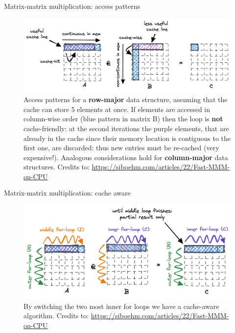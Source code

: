 \documentclass[10pt,aspectratio=169]{beamer}
\begin{document}
\begin{frame}{Matrix-matrix multiplication: access patterns}
    \begin{figure}
        \centering
        \includegraphics[width=\textwidth]{images/cache-unaware-dot-product.png}
        \caption{Access patterns for a \textbf{row-major} data structure, assuming that the cache can store 5 elements at once. If elements are accessed in column-wise order (blue pattern in matrix B) then the loop is \textbf{not} cache-friendly: at the second iterations the purple elements, that are already in the cache since their memory location is contiguous to the first one, are discarded: thus new entries must be re-cached (very expensive!). Analogous considerations hold for \textbf{column-major} data structures. Credits to: \url{https://siboehm.com/articles/22/Fast-MMM-on-CPU}}
    \end{figure}
\end{frame}

\begin{frame}{Matrix-matrix multiplication: cache aware}
    \begin{figure}
        \centering
        \includegraphics[width=\textwidth]{images/cache-aware-dot-prod-reorder-loops.png}
        \caption{By switching the two most inner for loops we have a cache-aware algorithm. Credits to: \url{https://siboehm.com/articles/22/Fast-MMM-on-CPU}}
    \end{figure}
\end{frame}
\end{document}
